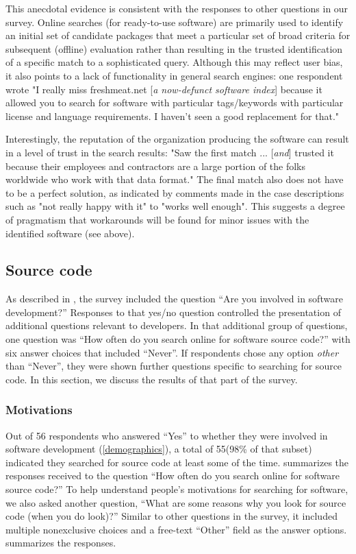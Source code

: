 \documentclass{casicswhitepaper}
\newcommand{\totalDevelopers}{56\xspace}
\newcommand{\totalSearchers}{55\xspace}
\begin{document}
This anecdotal evidence is consistent with the responses to other questions in our survey. Online searches (for ready-to-use software) are primarily used to identify an initial set of candidate packages that meet a particular set of broad criteria for subsequent (offline) evaluation rather than resulting in the trusted identification of a specific match to a sophisticated query. Although this may reflect user bias, it also points to a lack of functionality in general search engines: one respondent wrote "I really miss freshmeat.net [\emph{a now-defunct software index}] because it allowed you to search for software with particular tags/keywords with particular license and language requirements. I haven't seen a good replacement for that."

Interestingly, the reputation of the organization producing the software can result in a level of trust in the search results: "Saw the first match ... [\emph{and}] trusted it because their employees and contractors are a large portion of the folks worldwide who work with that data format." The final match also does not have to be a perfect solution, as indicated by comments made in the case descriptions such as "not really happy with it" to "works well enough". This suggests a degree of pragmatism that workarounds will be found for minor issues with the identified software (see above).


\subsection{Source code}

As described in , the survey included the question ``Are you involved in software development?''  Responses to that yes/no question controlled the presentation of additional questions relevant to developers.  In that additional group of questions, one question was ``How often do you search online for software source code?'' with six answer choices that included ``Never''.  If respondents chose any option \emph{other} than ``Never'', they were shown further questions specific to searching for source code.  In this section, we discuss the results of that part of the survey.


\subsubsection{Motivations}

Out of \totalDevelopers respondents who answered ``Yes'' to whether they were involved in software development (\ref{demographics}), a total of \totalSearchers (98\% of that subset) indicated they searched for source code at least some of the time.   summarizes the responses received to the question ``How often do you search online for software source code?''  To help understand people's motivations for searching for software, we also asked another question, ``What are some reasons why you look for source code (when you do look)?''  Similar to other questions in the survey, it included multiple nonexclusive choices and a free-text ``Other'' field as the answer options.   summarizes the responses.
\end{document}
